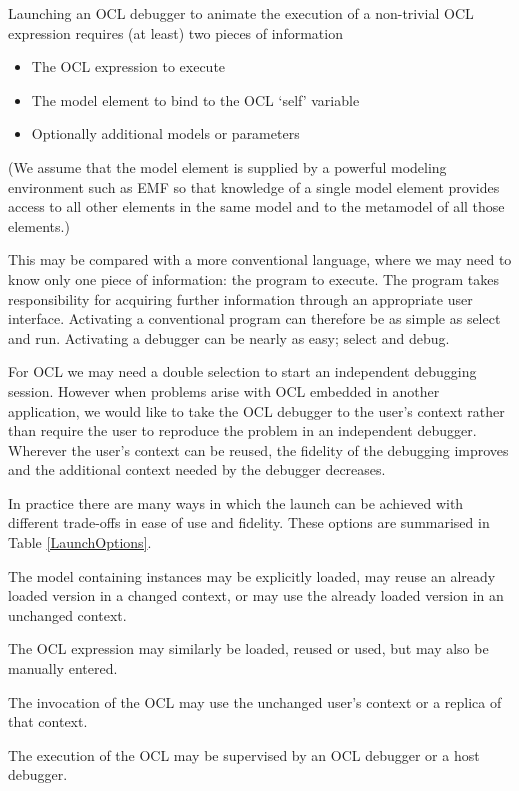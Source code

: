\documentclass[a4paper]{article}
\begin{document}
Launching an OCL debugger to animate the execution of a non-trivial OCL expression requires (at least) two pieces of information
\begin{itemize}
\item The OCL expression to execute
\item The model element to bind to the OCL `self' variable
\item Optionally additional models or parameters
\end{itemize}

(We assume that the model element is supplied by a powerful modeling environment such as EMF so that knowledge of a single model element provides access to all other elements in the same model and to the metamodel of all those elements.) 

This may be compared with a more conventional language, where we may need to know only one piece of information: the program to execute. The program takes responsibility for acquiring further information through an appropriate user interface. Activating a conventional program can therefore be as simple as select and run. Activating a debugger can be nearly as easy; select and debug.

For OCL we may need a double selection to start an independent debugging session. However when problems arise with OCL embedded in another application, we would like to take the OCL debugger to the user's context rather than require the user to reproduce the problem in an independent debugger. Wherever the user's context can be reused, the fidelity of the debugging improves and the additional context needed by the debugger decreases.

In practice there are many ways in which the launch can be achieved with different trade-offs in ease of use and fidelity. These options are summarised in Table \ref{LaunchOptions}.

The model containing instances may be explicitly loaded, may reuse an already loaded version in a changed context, or may use the already loaded version in an unchanged context.

The OCL expression may similarly be loaded, reused or used, but may also be manually entered.

The invocation of the OCL may use the unchanged user's context or a replica of that context.

The execution of the OCL may be supervised by an OCL debugger or a host debugger.
\end{document}
